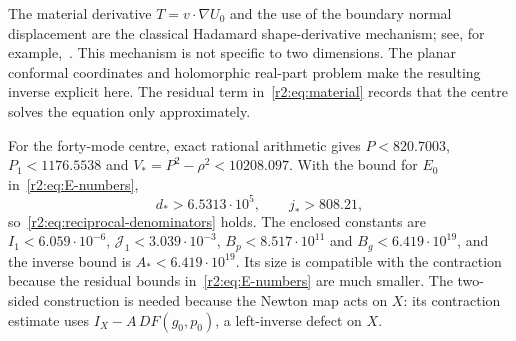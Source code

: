 \begin{remark}
The material derivative $T=v\cdot\nabla U_0$ and the use of the boundary normal displacement are the classical Hadamard shape-derivative mechanism; see, for example,~\cite{SZ92,HP18}. This mechanism is not specific to two dimensions. The planar conformal coordinates and holomorphic real-part problem make the resulting inverse explicit here. The residual term in~\eqref{r2:eq:material} records that the centre solves the equation only approximately.
\end{remark}

For the forty-mode centre, exact rational arithmetic gives $P<820.7003$, $P_1<1176.5538$ and $V_*=P^2-\rho^2<10208.097$. With the bound for $E_0$ in~\eqref{r2:eq:E-numbers},
\begin{equation}\label{r2:eq:reciprocal-numbers}
 d_*>6.5313\cdot10^5,\qquad j_*>808.21,
\end{equation}
so~\eqref{r2:eq:reciprocal-denominators} holds. The enclosed constants are $I_1<6.059\cdot10^{-6}$, $\mathcal J_1<3.039\cdot10^{-3}$, $B_p<8.517\cdot10^{11}$ and $B_g<6.419\cdot10^{19}$, and the inverse bound is $A_*<6.419\cdot10^{19}$. Its size is compatible with the contraction because the residual bounds in~\eqref{r2:eq:E-numbers} are much smaller. The two-sided construction is needed because the Newton map acts on $X$: its contraction estimate uses $I_X-A\,DF(g_0,p_0)$, a left-inverse defect on $X$.
